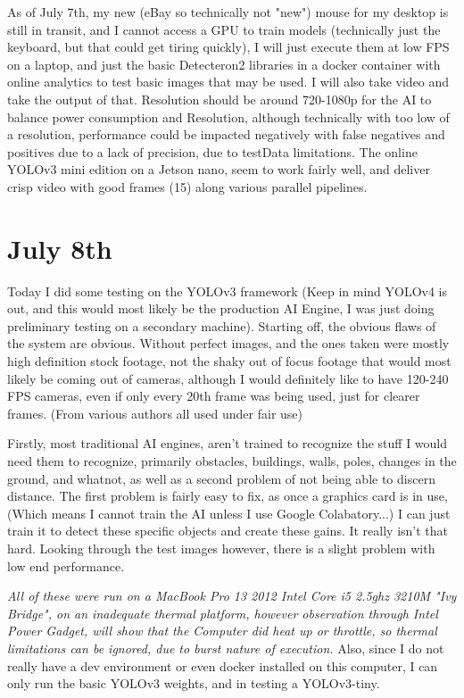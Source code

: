 \documentclass{article}
\begin{document}
    As of July 7th, my new (eBay so technically not "new") mouse for my desktop is still in transit, and I cannot access a GPU to train models (technically just the keyboard, but that could get tiring quickly), I will just execute them at low FPS on a laptop, and just the basic Detecteron2 libraries in a docker container with online analytics to test basic images that may be used. I will also take video and take the output of that. Resolution should be around 720-1080p for the AI to balance power consumption and Resolution, although technically with too low of a resolution, performance could be impacted negatively with false negatives and positives due to a lack of precision, due to testData limitations. The online YOLOv3 mini edition on a Jetson nano, seem to work fairly well, and deliver crisp video with good frames (15) along various parallel pipelines.

\section{July 8th}

Today I did some testing on the YOLOv3 framework (Keep in mind YOLOv4 is out, and this would most likely be the production AI Engine, I was just doing preliminary testing on a secondary machine). Starting off, the obvious flaws of the system are obvious. Without perfect images, and the ones taken were mostly high definition stock footage, not the shaky out of focus footage that would most likely be coming out of cameras, although I would definitely like to have 120-240 FPS cameras, even if only every 20th frame was being used, just for clearer frames. (From various authors all used under fair use)

Firstly, most traditional AI engines, aren't trained to recognize the stuff I would need them to recognize, primarily obstacles, buildings, walls, poles, changes in the ground, and whatnot, as well as a second problem of not being able to discern distance. The first problem is fairly easy to fix, as once a graphics card is in use, (Which means I cannot train the AI unless I use Google Colabatory...) I can just train it to detect these specific objects and create these gains. It really isn't that hard. Looking through the test images however, there is a slight problem with low end performance.

\textit{All of these were run on a MacBook Pro 13 2012 Intel Core i5 2.5ghz 3210M "Ivy Bridge", on an inadequate thermal platform, however observation through Intel Power Gadget, will show that the Computer did heat up or throttle, so thermal limitations can be ignored, due to burst nature of execution.}
Also, since I do not really have a dev environment or even docker installed on this computer, I can only run the basic YOLOv3 weights, and in testing a YOLOv3-tiny.
\end{document}
